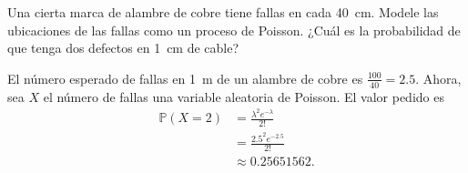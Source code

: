 \question

	Una cierta marca de alambre de cobre tiene fallas en cada \SI{40}{\centi\metre}. Modele las  ubicaciones de las fallas como un proceso de Poisson. ¿Cuál es la probabilidad de que tenga dos defectos en \SI{1}{\centi\metre} de cable?

	\begin{solutionordottedlines}
		El número esperado de fallas en \SI{1}{\metre} de un alambre de cobre es $\tfrac{100}{40}=\num{2.5}$. Ahora, sea $X$ el número de fallas una variable aleatoria de Poisson. El valor pedido es
		\begin{align*}
			\mathds{P}\left(X=2\right)
			&=\frac{\lambda^{2}e^{-\lambda}}{2!}\\
			&=\frac{\num{2.5}^{2}e^{-\num{2.5}}}{2!}\\
			&\approx\num{0.25651562}.
		\end{align*}
	\end{solutionordottedlines}